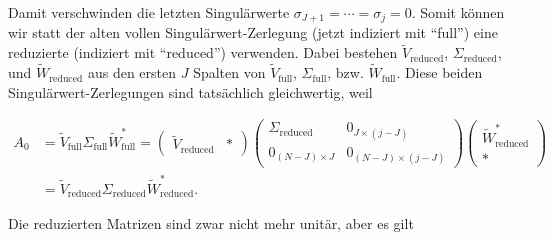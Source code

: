 Damit verschwinden die letzten Singulärwerte $\sigma_{J+1} = \cdots = \sigma_j = 0$.
Somit können wir statt der alten vollen Singulärwert-Zerlegung (jetzt indiziert mit \enquote{full}) eine reduzierte (indiziert mit \enquote{reduced}) verwenden.
Dabei bestehen $\tilde V_\mathrm{reduced}$, $\Sigma_\mathrm{reduced}$, und $\tilde W_\mathrm{reduced}$ aus den ersten $J$ Spalten von $\tilde V_\mathrm{full}$, $\Sigma_\mathrm{full}$, bzw. $\tilde W_\mathrm{full}$.
Diese beiden Singulärwert-Zerlegungen sind tatsächlich gleichwertig, weil

\begin{align*}
    A_0
    & =
    \tilde V_\mathrm{full} \Sigma_\mathrm{full} \tilde W_\mathrm{full}^\ast
    =
    \begin{pmatrix}
        \tilde V_\mathrm{reduced} & \ast
    \end{pmatrix}
    \begin{pmatrix}
        \Sigma_\mathrm{reduced} & 0_{J \times (j - J)} \\
        0_{(N - J) \times J}    & 0_{(N - J) \times (j - J)}
    \end{pmatrix}
    \begin{pmatrix}
        \tilde W_\mathrm{reduced}^\ast \\ \ast
    \end{pmatrix} \\
    & =
    \tilde V_\mathrm{reduced} \Sigma_\mathrm{reduced} \tilde W_\mathrm{reduced}^\ast.
\end{align*}

Die reduzierten Matrizen sind zwar nicht mehr unitär, aber es gilt

